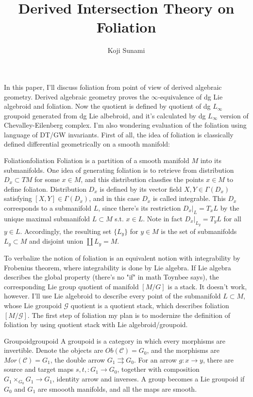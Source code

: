 \documentclass{article}
\title{Derived Intersection Theory on Foliation}
\author{Koji Sunami}
\begin{document}
\maketitle

\vspace{1cm}

In this paper, I'll discuss foliation from point of view of derived algebraic geometry.
Derived algebraic geometry proves the $\infty$-equivalence of dg Lie algebroid and foliation. 
Now the quotient is defined by quotient of dg $L_\infty$ groupoid generated from dg Lie albebroid, 
and it’s calculated by dg $L_\infty$ version of Chevalley-Eilenberg complex. 
I’m also wondering evaluation of the foliation using language of DT/GW invariants. 
First of all, the idea of foliation is classically defined differential geometrically on a smooth manifold: \\


\begin{definition}{Foliation}{foliation}
Foliation is a partition of a smooth manifold $M$ into its submanifolds.
One idea of generating foliation is to retrieve from distribution $D_x\subset TM$ for some $x\in M$,
and this distribution classfies the points $x\in M$ to define foliaton.
Distribution $D_x$ is defined by its vector field $X,Y\in \Gamma(D_x)$ satisfying $[X,Y]\in \Gamma(D_x)$,
and in this case $D_x$ is called integrable. This $D_x$ corresponds to a submanifold $L$,
since there's its restriction $D_x|_L = T_x L$ by the unique maximal submanifold $L\subset M$ s.t. $x\in L$.
Note in fact $D_x|_{L_y} = T_y L$ for all $y\in L$.
Accordingly, the resulting set $\{L_y\}$ for $y\in M$ is the set of submanifolds $L_y\subset M$ and disjoint union $\coprod L_y = M$.
\end{definition}


To verbalize the notion of foliation is an equivalent notion with integrability by Frobenius theorem,
where integrability is done by Lie algebra. If Lie algebra describes the global property (there's no "if" in math Toynbee says),
the corresponding Lie group quotient of manifold $[M/G]$ is a stack. It doesn't work, however. 
I'll use Lie algebroid to describe every point of the submanifold $L\subset M$,
whose Lie groupoid $\mathcal{G}$ quotient is a quotient stack, which describes foliation $[M/\mathcal{G}]$. 
The first step of foliation my plan is to modernize the definition of foliation by using quotient stack with Lie algebroid/groupoid.


\begin{definition}{Groupoid}{groupoid}
A groupoid is a category in which every morphisms are invertible. 
Denote the objects are $Ob(\mathcal{C}) = G_0$, and the morphisms are $Mor(\mathcal{C})=G_1$, the double arrow
$G_1 \rightrightarrows G_0$. For an arrow $g:x\to y$, there are source and target maps $s,t,:G_1\to G_0$, 
together with composition $G_1 \times_{G_0} G_1\to G_1$, identity arrow and inverses.
A group becomes a Lie groupoid if $G_0$ and $G_1$ are smoooth manifolds, and all the maps are smooth.
\end{definition}
\end{document}
